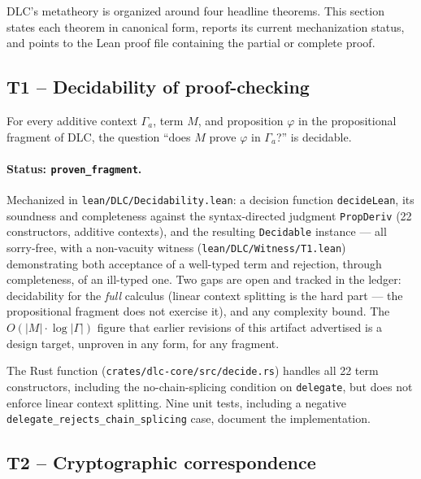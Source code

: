 
DLC's metatheory is organized around four headline theorems.  This
section states each theorem in canonical form, reports its current
mechanization status, and points to the Lean proof file containing
the partial or complete proof.

\subsection{T1 -- Decidability of proof-checking}

\begin{theorem}
For every additive context $\Gamma_a$, term $M$, and proposition
$\varphi$ in the propositional fragment of DLC, the question ``does
$M$ prove $\varphi$ in $\Gamma_a$?'' is decidable.
\end{theorem}

\paragraph{Status: \texttt{proven\_fragment}.}
Mechanized in \texttt{lean/DLC/Decidability.lean}: a decision function
\texttt{decideLean}, its soundness and completeness against the
syntax-directed judgment \texttt{PropDeriv} (22 constructors, additive
contexts), and the resulting \texttt{Decidable} instance --- all
sorry-free, with a non-vacuity witness
(\texttt{lean/DLC/Witness/T1.lean}) demonstrating both acceptance of a
well-typed term and rejection, through completeness, of an ill-typed
one.  Two gaps are open and tracked in the ledger: decidability for
the \emph{full} calculus (linear context splitting is the hard part
--- the propositional fragment does not exercise it), and any
complexity bound.  The $O(|M| \cdot \log |\Gamma|)$ figure that
earlier revisions of this artifact advertised is a design target,
unproven in any form, for any fragment.

The Rust function (\texttt{crates/dlc-core/src/decide.rs}) handles all
22 term constructors, including the no-chain-splicing condition on
\texttt{delegate}, but does not enforce linear context splitting.
Nine unit tests, including a negative
\texttt{delegate\_rejects\_chain\_splicing} case, document the
implementation.

\subsection{T2 -- Cryptographic correspondence}

